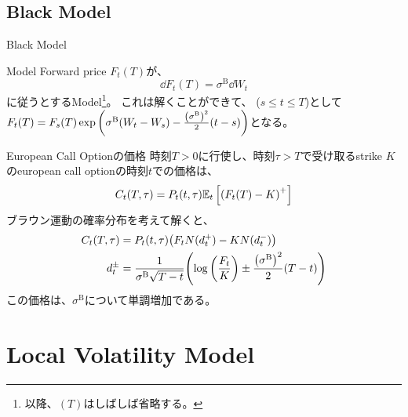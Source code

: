 \documentclass[dvipdfmx,9pt]{beamer}
\begin{document}
\subsection{Black Model}
\begin{frame}{Black Model}
  \begin{block}{Model}
    Forward price $F_{t}(T)$が、
    \begin{equation}
      \dd F_{t}(T) = \sigma^{\mathrm{B}} \dd W_{t}
    \end{equation}
    に従うとするModel\footnote{以降、$(T)$はしばしば省略する。}。
    これは解くことができて、 ($s \leq t\leq T$)として$F_{t}(T) = F_{s}(T)\expi{\sigma^{\mathrm{B}}(W_{t} - W_{s})-\frac{\pqty{\sigma^{\mathrm{B}}}^{2}}{2}(t-s)}$となる。
  \end{block}
  \begin{block}{European Call Optionの価格}
    時刻$T>0$に行使し、時刻$\tau >T$で受け取るstrike $K$のeuropean call optionの時刻$t$での価格は、
    \begin{equation}
      C_{t}(T,\tau) = P_{t}(t,\tau)\exv[t]{\pqty{F_{t}(T) - K}^{+}}
    \end{equation}
    ブラウン運動の確率分布を考えて解くと、
    \begin{align}
      C_{t}(T,\tau) & = P_{t}(t,\tau) \pqty{F_{t} N(d_{t}^{+}) - KN(d_{t}^{-})}                                                                  \\
      d_{t}^{\pm}   & = \frac{1}{\sigma^{\mathrm{B}}\sqrt{T-t}}\pqty{\log\pqty{\frac{F_{t}}{K}}\pm\frac{\pqty{\sigma^{\mathrm{B}}}^{2}}{2}(T-t)}
    \end{align}
    この価格は、$\sigma^{\mathrm{B}}$について単調増加である。
  \end{block}
\end{frame}

\section{Local Volatility Model}
\end{document}
